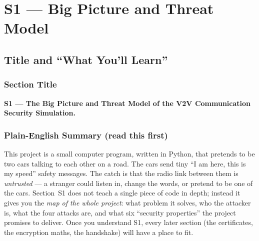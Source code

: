 \documentclass[11pt,a4paper]{report}
\begin{document}
\clearpage


\chapter{S1 --- Big Picture and Threat Model}

\section{Title and ``What You'll Learn''}

\subsection*{Section Title}
\textbf{S1 --- The Big Picture and Threat Model of the V2V Communication
Security Simulation.}

\subsection*{Plain-English Summary (read this first)}
This project is a small computer program, written in Python, that pretends to
be two cars talking to each other on a road. The cars send tiny ``I am here,
this is my speed'' safety messages. The catch is that the radio link between
them is \emph{untrusted} --- a stranger could listen in, change the words, or
pretend to be one of the cars. Section~S1 does not teach a single piece of code
in depth; instead it gives you the \emph{map of the whole project}: what problem
it solves, who the attacker is, what the four attacks are, and what six
``security properties'' the project promises to deliver. Once you understand
S1, every later section (the certificates, the encryption maths, the handshake)
will have a place to fit.
\end{document}
